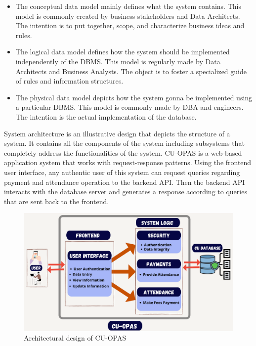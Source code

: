 \begin{itemize}
  \item The conceptual data model mainly defines what the system contains. This model is commonly created by business stakeholders and Data Architects. The intention is to put together, scope, and characterize business ideas and rules.
  \item The logical data model defines how the system should be implemented independently of the DBMS. This model is regularly made by Data Architects and Business Analysts. The object is to foster a specialized guide of rules and information structures.
  \item The physical data model depicts how the system gonna be implemented using a particular DBMS. This model is commonly made by DBA and engineers. The intention is the actual implementation of the database.
\end{itemize}

System architecture is an illustrative design that depicts the structure of a system. It contains all the components of the system including subsystems that completely address the functionalities of the system. CU-OPAS is a web-based application system that works with request-response patterns. Using the frontend user interface, any authentic user of this system can request queries regarding payment and attendance operation to the backend API. Then the backend API interacts with the database server and generates a response according to queries that are sent back to the frontend.\\
\begin{figure}[H]
    \centering
    \includegraphics[width=1\textwidth]{images/archi}
    \caption{Architectural design of CU-OPAS}
    \label{fig:archi}
\end{figure}

